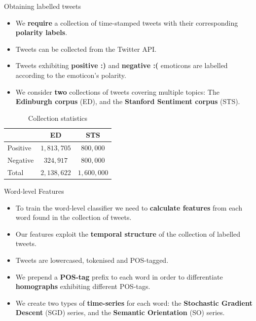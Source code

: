 \documentclass[handout]{beamer}
\begin{document}
\begin{frame}{Obtaining labelled tweets}
\begin{scriptsize}
\begin{itemize}
\item We \textbf{require} a collection of time-stamped tweets with their corresponding \textbf{polarity labels}. 
\item Tweets can be collected from the Twitter API.
\item Tweets exhibiting \textbf{positive :)} and \textbf{negative :(} emoticons are labelled according to the emoticon's polarity.
\item We consider \textbf{two}  collections of tweets covering multiple topics: The \textbf{Edinburgh corpus} (ED), and the \textbf{Stanford Sentiment corpus} (STS).
\end{itemize}

\begin{table}[htbp]
\begin{center}
\begin{tabular}{l|c|c}
\hline
 & ED & STS \\ \hline
Positive & $1,813,705$ & $800,000$  \\ 
Negative & $324,917$ & $800,000$  \\ \hline
Total & $2,138,622$ & $1,600,000$ \\ 
\end{tabular}
\end{center}
\caption{Collection statistics}
\label{tab:colstats}
\end{table}
\end{scriptsize}

\end{frame}




\begin{frame}{Word-level Features}
\begin{scriptsize}
\begin{itemize}
\item To train the word-level classifier we need to \textbf{calculate features} from each word found in the collection of tweets.
\item Our features exploit the \textbf{temporal structure} of the collection of labelled tweets.
\item Tweets are lowercased, tokenised and POS-tagged.

\item We prepend a \textbf{POS-tag} prefix to each word in order to differentiate \textbf{homographs} exhibiting different POS-tags.

\item We create two types of \textbf{time-series} for each word: the \textbf{Stochastic Gradient Descent} (SGD) series, and the \textbf{Semantic Orientation} (SO) series.

\end{itemize}
\end{scriptsize}

\end{frame}
\end{document}
